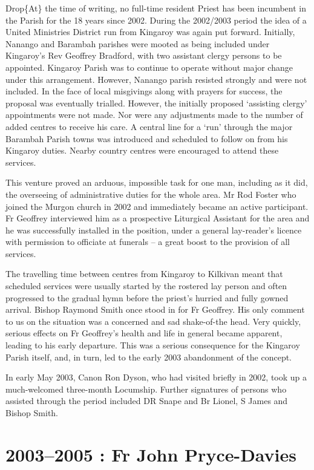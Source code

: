 Drop\{At\} the time of writing, no full-time resident Priest has been incumbent in the Parish for the 18 years since 2002. During the 2002/2003 period the idea of a United Ministries District run from Kingaroy was again put forward. Initially, Nanango and Barambah parishes were mooted as being included under Kingaroy's Rev Geoffrey Bradford, with two assistant clergy persons to be appointed. Kingaroy Parish was to continue to operate without major change under this arrangement. However, Nanango parish resisted strongly and were not included. In the face of local misgivings along with prayers for success, the proposal was eventually trialled. However, the initially proposed `assisting clergy' appointments were not made. Nor were any adjustments made to the number of added centres to receive his care. A central line for a `run' through the major Barambah Parish towns was introduced and scheduled to follow on from his Kingaroy duties. Nearby country centres were encouraged to attend these services.

This venture proved an arduous, impossible task for one man, including as it did, the overseeing of administrative duties for the whole area. Mr Rod Foster who joined the Murgon church in 2002 and immediately became an active participant. Fr Geoffrey interviewed him as a prospective Liturgical Assistant for the area and he was successfully installed in the position, under a general lay-reader's licence with permission to officiate at funerals -- a great boost to the provision of all services.

The travelling time between centres from Kingaroy to Kilkivan meant that scheduled services were usually started by the rostered lay person and often progressed to the gradual hymn before the priest's hurried and fully gowned arrival. Bishop Raymond Smith once stood in for Fr Geoffrey. His only comment to us on the situation was a concerned and sad shake-of-the head. Very quickly, serious effects on Fr Geoffrey's health and life in general became apparent, leading to his early departure. This was a serious consequence for the Kingaroy Parish itself, and, in turn, led to the early 2003 abandonment of the concept.

In early May 2003, Canon Ron Dyson, who had visited briefly in 2002, took up a much-welcomed three-month Locumship. Further signatures of persons who assisted through the period included DR Snape and Br Lionel, S James and Bishop Smith.

\hypertarget{fr-john-pryce-davies}{%
\section{2003--2005 : Fr John Pryce-Davies}\label{fr-john-pryce-davies}}


